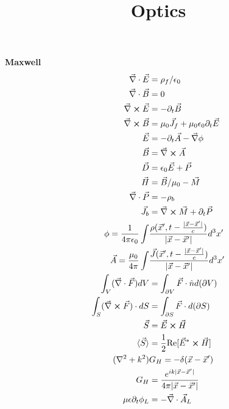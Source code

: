 \documentclass[12pt]{article}
\title{\vspace{-2em}Optics}
\date{}
\begin{document}
\maketitle

\vspace{-4em}
\begin{multicols}{3}
\textbf{Maxwell}
\begin{align}
  \vec{\nabla} \cdot \vec{E} &= \rho_f / \epsilon_0\\
  \vec{\nabla} \cdot \vec{B} &= 0\\
  \vec{\nabla} \cross \vec{E} &= - \partial_t \vec{B}\\
  \vec{\nabla} \cross \vec{B} &= \mu_0 \vec{J}_f +
  \mu_0 \epsilon_0 \partial_t \vec{E}\\
  \vec{E} &= -\partial_t \vec{A} - \vec{\nabla} \phi\\
  \vec{B} &= \vec{\nabla} \cross \vec{A}\\
  \vec{D} &= \epsilon_0 \vec{E} + \vec{P}\\
  \vec{H} &= \vec{B}/\mu_0 - \vec{M}\\
  \vec{\nabla} \cdot \vec{P} &= -\rho_b\\
  \vec{J}_b &= \vec{\nabla} \cross \vec{M} + \partial_t \vec{P}\\
  \phi = \frac{1}{4\pi\epsilon_0} \int &\frac{
    \rho(\vec{x}^{\prime}, t - \frac{\lvert\vec{x} - \vec{x}^{\prime}\rvert}{c})}{
    \lvert \vec{x} - \vec{x}^{\prime} \rvert} d^3 x^{\prime}\\
  \vec{A} = \frac{\mu_0}{4\pi} \int &\frac{\vec{J}(\vec{x}^{\prime},
    t - \frac{\lvert \vec{x} - \vec{x}^{\prime} \rvert}{c})}
  {\lvert \vec{x} - \vec{x}^{\prime} \rvert} d^3 x^{\prime}\\
  \int_V (\vec{\nabla} \cdot \vec{F}) dV &= \int_{\partial V} \vec{F} \cdot \hat{n} d(\partial V)\\
  \int_{S} (\vec{\nabla} \cross \vec{F}) \cdot dS &= \int_{\partial S} \vec{F} \cdot d(\partial S)\\
  \vec{S} &= \vec{E} \cross \vec{H}\\
  \langle \vec{S} \rangle &= \frac{1}{2}
  \textrm{Re}[\vec{E}^{*} \cross \vec{H}]\\
  (\nabla^2 + k^2) &G_{H} =
  -\delta(\vec{x} - \vec{x}^{\prime})\\
  G_H &= \frac{e^{ik\lvert \vec{x}
      - \vec{x}^{\prime} \rvert}}{4\pi \lvert \vec{x} - \vec{x}^{\prime} \rvert}\\
  \mu \epsilon \partial_t \phi_L &= -\vec{\nabla} \cdot \vec{A}_L\\

\end{align}
\end{multicols}
\end{document}

